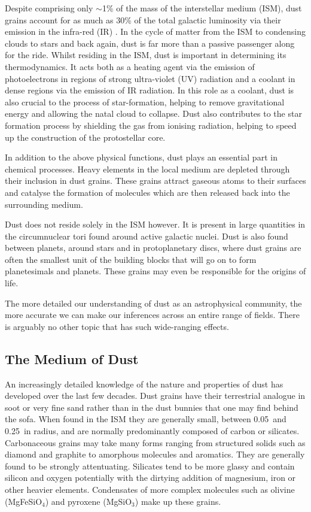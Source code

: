Despite comprising only $\sim$1\% of the mass of the interstellar medium (ISM), dust grains account for as much as 30\% of the total galactic luminosity via their emission in the infra-red (IR) \citep{Li2003}.  In the cycle of matter from the ISM to condensing clouds to stars and back again, dust is far more than a passive passenger along for the ride.  Whilst residing in the ISM, dust is important in determining its thermodynamics.  It acts both as a heating agent via the emission of photoelectrons in regions of strong ultra-violet (UV) radiation and a coolant in dense regions via the emission of IR radiation.  In this role as a coolant, dust is also crucial to the process of star-formation, helping to remove gravitational energy and allowing the natal cloud to collapse.  Dust also contributes to the star formation process by shielding the gas from ionising radiation, helping to speed up the construction of the protostellar core. 

In addition to the above physical functions, dust plays an essential part in chemical processes.  Heavy elements in the local medium are depleted through their inclusion in dust grains.  These grains  attract gaseous atoms to their surfaces and catalyse the formation of molecules which are then released back into the surrounding medium.

Dust does not reside solely in the ISM however.  It is present in  large quantities in the circumnuclear tori found around active galactic nuclei.  Dust is also found between planets, around stars and in protoplanetary discs, where dust grains are often the smallest unit of the building blocks that will go on to form planetesimals and planets.  These grains may even be responsible for the origins of life.  

The more detailed our understanding of dust as an astrophysical community, the more accurate we can make our inferences across an entire range of  fields.  There is arguably no other topic that has such wide-ranging effects.


\subsection{The Medium of Dust}

An increasingly detailed knowledge of the nature and properties of dust has developed over the last few decades. Dust grains have their terrestrial analogue in soot or very fine sand rather than in the dust bunnies that one may find behind the sofa.  When found in the ISM they are generally small, between 0.05\micron\ and 0.25\micron\ in radius, and are normally predominantly composed of carbon or silicates.  Carbonaceous grains may take many forms ranging from structured solids such as diamond and graphite to amorphous molecules and aromatics.  They are generally found to be strongly attentuating.  Silicates tend to be more glassy and contain silicon and oxygen potentially with the dirtying addition of magnesium, iron or other heavier elements.  Condensates of more complex molecules such as olivine (MgFeSiO$_4$) and pyroxene (MgSiO$_3$) make up these grains.  

